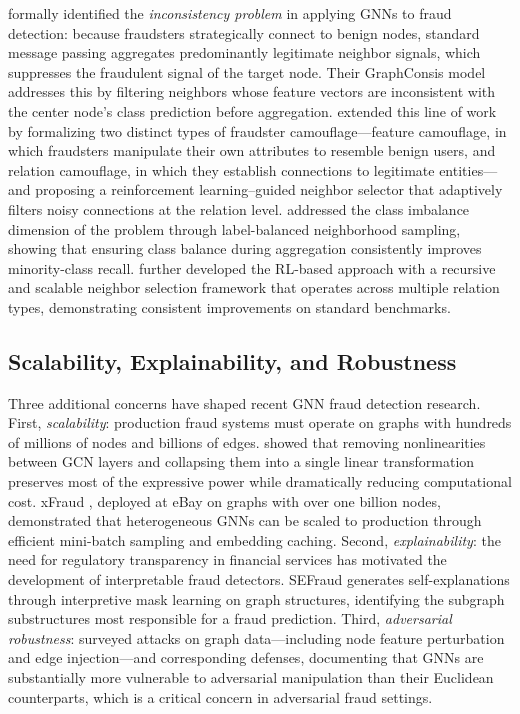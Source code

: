 \cite{liu2020alleviating} formally identified the \emph{inconsistency problem} in
applying GNNs to fraud detection: because fraudsters strategically connect to benign
nodes, standard message passing aggregates predominantly legitimate neighbor signals,
which suppresses the fraudulent signal of the target node. Their GraphConsis model
addresses this by filtering neighbors whose feature vectors are inconsistent with the
center node's class prediction before aggregation. \cite{dou2020enhancing} extended
this line of work by formalizing two distinct types of fraudster camouflage—feature
camouflage, in which fraudsters manipulate their own attributes to resemble benign users,
and relation camouflage, in which they establish connections to legitimate entities—and
proposing a reinforcement learning–guided neighbor selector that adaptively filters
noisy connections at the relation level. \cite{liu2021pick} addressed the class
imbalance dimension of the problem through label-balanced neighborhood sampling, showing
that ensuring class balance during aggregation consistently improves minority-class
recall. \cite{peng2022reinforced} further developed the RL-based approach with a
recursive and scalable neighbor selection framework that operates across multiple
relation types, demonstrating consistent improvements on standard benchmarks.

\subsection{Scalability, Explainability, and Robustness}

Three additional concerns have shaped recent GNN fraud detection research. First,
\emph{scalability}: production fraud systems must operate on graphs with hundreds of
millions of nodes and billions of edges. \cite{wu2019simplifying} showed that removing
nonlinearities between GCN layers and collapsing them into a single linear transformation
preserves most of the expressive power while dramatically reducing computational cost.
xFraud \cite{rao2022xfraud}, deployed at eBay on graphs with over one billion nodes,
demonstrated that heterogeneous GNNs can be scaled to production through efficient
mini-batch sampling and embedding caching. Second, \emph{explainability}: the need for
regulatory transparency in financial services has motivated the development of
interpretable fraud detectors. SEFraud \cite{sefraud2024} generates self-explanations
through interpretive mask learning on graph structures, identifying the subgraph
substructures most responsible for a fraud prediction. Third, \emph{adversarial
robustness}: \cite{sun2018adversarial} surveyed attacks on graph data—including node
feature perturbation and edge injection—and corresponding defenses, documenting that
GNNs are substantially more vulnerable to adversarial manipulation than their Euclidean
counterparts, which is a critical concern in adversarial fraud settings.


